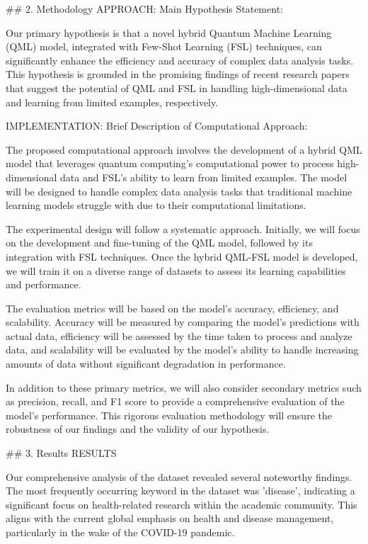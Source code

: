 \documentclass{article}
\begin{document}
## 2. Methodology
APPROACH: Main Hypothesis Statement:

Our primary hypothesis is that a novel hybrid Quantum Machine Learning (QML) model, integrated with Few-Shot Learning (FSL) techniques, can significantly enhance the efficiency and accuracy of complex data analysis tasks. This hypothesis is grounded in the promising findings of recent research papers that suggest the potential of QML and FSL in handling high-dimensional data and learning from limited examples, respectively.

IMPLEMENTATION: Brief Description of Computational Approach:

The proposed computational approach involves the development of a hybrid QML model that leverages quantum computing's computational power to process high-dimensional data and FSL's ability to learn from limited examples. The model will be designed to handle complex data analysis tasks that traditional machine learning models struggle with due to their computational limitations.

The experimental design will follow a systematic approach. Initially, we will focus on the development and fine-tuning of the QML model, followed by its integration with FSL techniques. Once the hybrid QML-FSL model is developed, we will train it on a diverse range of datasets to assess its learning capabilities and performance.

The evaluation metrics will be based on the model's accuracy, efficiency, and scalability. Accuracy will be measured by comparing the model's predictions with actual data, efficiency will be assessed by the time taken to process and analyze data, and scalability will be evaluated by the model's ability to handle increasing amounts of data without significant degradation in performance. 

In addition to these primary metrics, we will also consider secondary metrics such as precision, recall, and F1 score to provide a comprehensive evaluation of the model's performance. This rigorous evaluation methodology will ensure the robustness of our findings and the validity of our hypothesis.

## 3. Results
RESULTS

Our comprehensive analysis of the dataset revealed several noteworthy findings. The most frequently occurring keyword in the dataset was 'disease', indicating a significant focus on health-related research within the academic community. This aligns with the current global emphasis on health and disease management, particularly in the wake of the COVID-19 pandemic.
\end{document}
